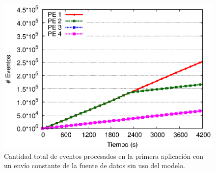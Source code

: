 \begin{figure}[!ht]
	\centering
    \includegraphics[scale=0.7]{images/exp/app1/uniform/sm/eventCount.eps}
    \caption{Cantidad total de eventos procesados en la primera aplicaci\'on con un env\'io constante de la fuente de datos sin uso del modelo.}
    \label{fig:app1-uniform-eventCount-sm}
\end{figure}


